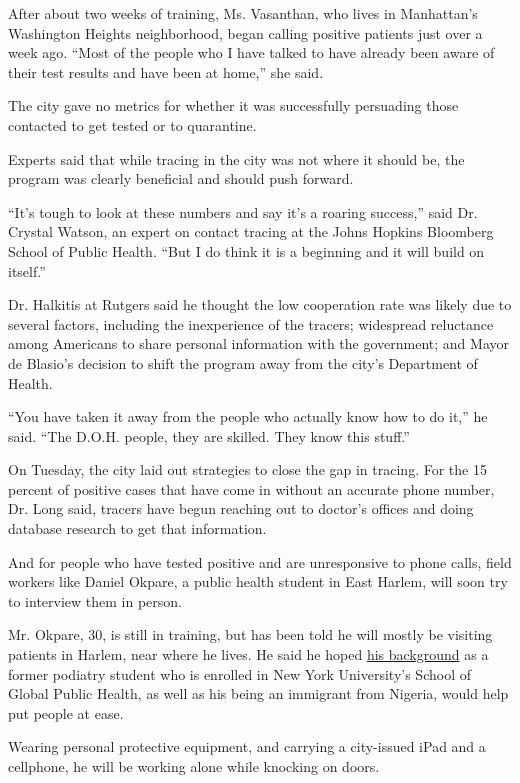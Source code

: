 After about two weeks of training, Ms. Vasanthan, who lives in
Manhattan's Washington Heights neighborhood, began calling positive
patients just over a week ago. ``Most of the people who I have talked to
have already been aware of their test results and have been at home,''
she said.

The city gave no metrics for whether it was successfully persuading
those contacted to get tested or to quarantine.

Experts said that while tracing in the city was not where it should be,
the program was clearly beneficial and should push forward.

``It's tough to look at these numbers and say it's a roaring success,''
said Dr. Crystal Watson, an expert on contact tracing at the Johns
Hopkins Bloomberg School of Public Health. ``But I do think it is a
beginning and it will build on itself.''

Dr. Halkitis at Rutgers said he thought the low cooperation rate was
likely due to several factors, including the inexperience of the
tracers; widespread reluctance among Americans to share personal
information with the government; and Mayor de Blasio's decision to shift
the program away from the city's Department of Health.

``You have taken it away from the people who actually know how to do
it,'' he said. ``The D.O.H. people, they are skilled. They know this
stuff.''

On Tuesday, the city laid out strategies to close the gap in tracing.
For the 15 percent of positive cases that have come in without an
accurate phone number, Dr. Long said, tracers have begun reaching out to
doctor's offices and doing database research to get that information.

And for people who have tested positive and are unresponsive to phone
calls, field workers like Daniel Okpare, a public health student in East
Harlem, will soon try to interview them in person.

Mr. Okpare, 30, is still in training, but has been told he will mostly
be visiting patients in Harlem, near where he lives. He said he hoped
\href{https://www.linkedin.com/in/domph/}{his background} as a former
podiatry student who is enrolled in New York University's School of
Global Public Health, as well as his being an immigrant from Nigeria,
would help put people at ease.

Wearing personal protective equipment, and carrying a city-issued iPad
and a cellphone, he will be working alone while knocking on doors.

